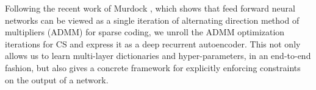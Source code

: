 
Following the recent work of Murdock \etal, which shows that feed forward neural networks can be viewed as a single iteration of alternating direction method of multipliers (ADMM) for sparse coding, we unroll the ADMM optimization iterations for CS and express it as a deep recurrent autoencoder. This not only allows us to learn multi-layer dictionaries and hyper-parameters, in an end-to-end fashion, but also gives a concrete framework for explicitly enforcing constraints on the output of a network.






